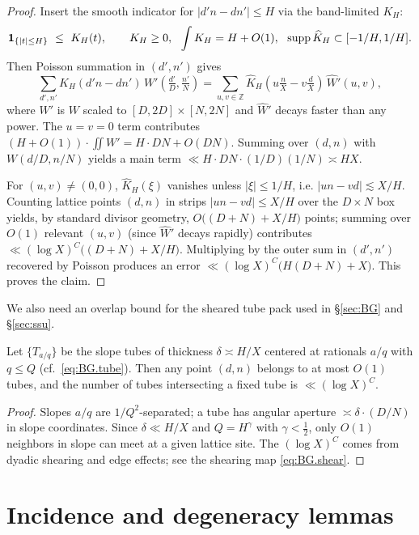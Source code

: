 \begin{proof}
Insert the smooth indicator for $|d'n-dn'|\le H$ via the band-limited $K_H$:
\[
\mathbf 1_{\{|t|\le H\}}\ \le\ K_H(t),\qquad K_H\ge 0,\ \ \int K_H=H+O(1),\ \ \supp \widehat K_H\subset[-1/H,1/H].
\]
Then Poisson summation in $(d',n')$ gives
\[
\sum_{d',n'} K_H(d'n-dn')\,W'(\tfrac{d'}D,\tfrac{n'}N)
=\sum_{u,v\in\mathbb Z} \widehat K_H(u\tfrac{n}{X}-v\tfrac{d}{X})\,\widehat W'\!(u,v),
\]
where $W'$ is $W$ scaled to $[D,2D]\times[N,2N]$ and $\widehat W'$ decays faster than any power. The $u=v=0$ term contributes $(H+O(1))\cdot \iint W' = H\cdot DN+O(DN)$. Summing over $(d,n)$ with $W(d/D,n/N)$ yields a main term $\ll H\cdot DN\cdot (1/D)(1/N) \asymp H X$.  

For $(u,v)\ne(0,0)$, $\widehat K_H(\xi)$ vanishes unless $|\xi|\le 1/H$, i.e. $|u n - v d|\lesssim X/H$. Counting lattice points $(d,n)$ in strips $|u n-v d|\le X/H$ over the $D\times N$ box yields, by standard divisor geometry, $O\!\big((D+N)+X/H\big)$ points; summing over $O(1)$ relevant $(u,v)$ (since $\widehat W'$ decays rapidly) contributes $\ll (\log X)^C\big((D+N)+X/H\big)$. Multiplying by the outer sum in $(d',n')$ recovered by Poisson produces an error $\ll (\log X)^C\big(H(D+N)+X\big)$. This proves the claim.
\end{proof}

We also need an overlap bound for the sheared tube pack used in \S\ref{sec:BG} and \S\ref{sec:ssu}.

\begin{lemma}\label{lem:tube-overlap}
Let $\{T_{a/q}\}$ be the slope tubes of thickness $\delta\asymp H/X$ centered at rationals $a/q$ with $q\le Q$ (cf.\ \eqref{eq:BG.tube}). Then any point $(d,n)$ belongs to at most $O(1)$ tubes, and the number of tubes intersecting a fixed tube is $\ll (\log X)^C$.
\end{lemma}

\begin{proof}
Slopes $a/q$ are $1/Q^2$-separated; a tube has angular aperture $\asymp \delta\cdot(D/N)$ in slope coordinates. Since $\delta\ll H/X$ and $Q=H^\gamma$ with $\gamma<\tfrac12$, only $O(1)$ neighbors in slope can meet at a given lattice site. The $(\log X)^C$ comes from dyadic shearing and edge effects; see the shearing map \eqref{eq:BG.shear}.
\end{proof}

\section{Incidence and degeneracy lemmas}\label{app:incidence}

